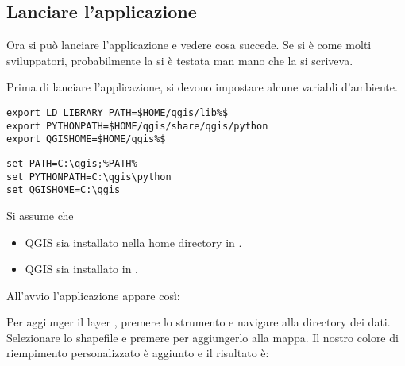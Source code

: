 \subsection{Lanciare l'applicazione}

Ora si può lanciare l'applicazione e vedere cosa succede. Se si è come molti sviluppatori, probabilmente la si è testata man mano che la si scriveva. 

Prima di lanciare l'applicazione, si devono impostare alcune variabli d'ambiente. 

\nix{}\osx{}
\begin{verbatim}
export LD_LIBRARY_PATH=$HOME/qgis/lib%$
export PYTHONPATH=$HOME/qgis/share/qgis/python
export QGISHOME=$HOME/qgis%$
\end{verbatim}

\win{}
\begin{verbatim}
set PATH=C:\qgis;%PATH%
set PYTHONPATH=C:\qgis\python
set QGISHOME=C:\qgis
\end{verbatim}

Si assume che
\begin{itemize}
\item\nix{}\osx{}QGIS sia installato nella home directory in 
. 
\item\win{}QGIS sia installato in .
\end{itemize}

All'avvio l'applicazione appare così:


Per aggiunger il layer , premere lo strumento 
 e navigare alla directory dei dati.
Selezionare lo shapefile e premere  per aggiungerlo alla mappa. 
Il nostro colore di riempimento personalizzato è aggiunto e il risultato è:


